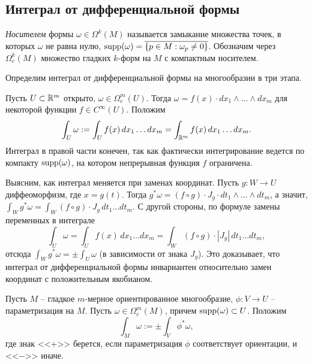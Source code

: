 
\subsection{Интеграл от дифференциальной формы}

\begin{definition}
    \textit{Носителем} формы $\omega \in \Omega^k(M)$ называется замыкание множества точек, в которых $\omega$ не равна нулю, $\operatorname{supp}(\omega) = \overline{\{p \in M : \omega_p \ne 0\}}$. Обозначим через $\Omega_c^k(M)$ множество гладких $k$-форм на $M$ с компактным носителем.
\end{definition}

Определим интеграл от дифференциальной формы на многообразии в три этапа.

\begin{definition}
    Пусть $U \subset \mathbb{R}^m$ открыто, $\omega \in \Omega_c^m(U)$. Тогда $\omega = f(x)\cdot dx_1 \wedge \dotsc \wedge dx_m$ для некоторой функции $f \in C^\infty(U)$. Положим
    \[
    \int_U \omega := \int_U f(x)\, dx_1 \dotsc dx_m = \int_{\mathbb{R}^m} f(x)\, dx_1 \dotsc dx_m.
    \]
	Интеграл в правой части конечен, так как фактически интегрирование ведется по компакту $\operatorname{supp}(\omega)$, на котором непрерывная функция $f$ ограничена.
\end{definition}

\begin{note}
	Выясним, как интеграл меняется при заменах координат. Пусть $g: W \to U$ диффеоморфизм, где $x = g(t)$.
Тогда $g^*\omega = (f \circ g) \cdot J_g \cdot dt_1 \wedge \dotsc \wedge dt_m$, а значит, $\int_W g^*\omega = \int_W (f \circ g)\cdot J_g\, dt_1  \dotsc dt_m$. С другой стороны, по формуле замены переменных в интеграле
\[
\int_U \omega = \int_U f(x)\, dx_1 \dotsc dx_m = \int_W (f \circ g) \cdot|J_g|\, dt_1 \dotsc dt_m,
\]
отсюда $\int_W g^*\omega = \pm \int_U \omega$ (в зависимости от знака $J_g$). Это доказывает, что интеграл от дифференциальной формы инвариантен относительно замен координат с положительным якобианом.
\end{note}

\begin{definition}
    Пусть $M$ -- гладкое $m$-мерное ориентированное многообразие, $\phi: V \to U$ -- параметризация на $M$. Пусть $\omega \in \Omega_c^m(M)$, причем $\operatorname{supp}(\omega) \subset U$. Положим
    \[
    \int_M \omega := \pm \int_V \phi^*\omega,
    \]
    где знак <<$+$>> берется, если параметризация $\phi$ соответствует ориентации, и <<$-$>> иначе.
\end{definition}

